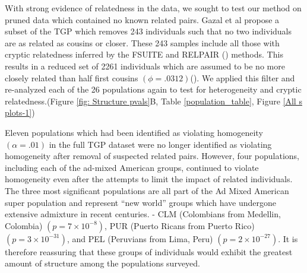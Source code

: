 With strong evidence of relatedness in the data, we sought to test
our method on pruned data which contained no known related pairs.
Gazal et al propose a subset of the TGP which removes 243 individuals
such that no two individuals are as related as cousins or closer.
These 243 samples include all those with cryptic relatedness inferred
by the FSUITE and RELPAIR (\citealp{boehnke1997accurate,epstein2000improved})
methods. This results in a reduced set of 2261 individuals which are
assumed to be no more closely related than half first cousins $\left(\phi=.0312\right)$(\citealp{gazal2015high}).
We applied this filter and re-analyzed each of the 26 populations
again to test for heterogeneity and cryptic relatedness.(Figure \ref{fig: Structure pvals}B,
Table \ref{population_table}, Figure \ref{All s plots-1})

Eleven populations which had been identified as violating homogeneity
$\left(\alpha=.01\right)$ in the full TGP dataset were no longer
identified as violating homogeneity after removal of suspected related
pairs. However, four populations, including each of the ad-mixed American
groups, continued to violate homogeneity even after the attempts to
limit the impact of related individuals. The three most significant
populations are all part of the Ad Mixed American super population
and represent ``new world'' groups which have undergone extensive
admixture in recent centuries. - CLM (Colombians from Medellin, Colombia) $\left(p=7\times10^{-8}\right)$,
PUR (Puerto Ricans from Puerto Rico) $\left(p=3\times10^{-31}\right)$,
and PEL (Peruvians from Lima, Peru) $\left(p=2\times10^{-27}\right)$.
It is therefore reassuring that these groups of individuals would
exhibit the greatest amount of structure among the populations surveyed. 


